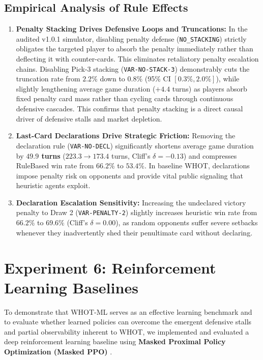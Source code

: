 \documentclass[11pt]{article}
\begin{document}
\subsection{Empirical Analysis of Rule Effects}
\begin{enumerate}
  \item \textbf{Penalty Stacking Drives Defensive Loops and Truncations:} In the audited v1.0.1 simulator, disabling penalty defense (\texttt{NO\_STACKING}) strictly obligates the targeted player to absorb the penalty immediately rather than deflecting it with counter-cards. This eliminates retaliatory penalty escalation chains. Disabling Pick-3 stacking (\texttt{VAR-NO-STACK-3}) demonstrably cuts the truncation rate from \textbf{$2.2\%$} down to \textbf{$0.8\%$} (95\% CI $[0.3\%, 2.0\%]$), while slightly lengthening average game duration ($+4.4$ turns) as players absorb fixed penalty card mass rather than cycling cards through continuous defensive cascades. This confirms that penalty stacking is a direct causal driver of defensive stalls and market depletion.
  \item \textbf{Last-Card Declarations Drive Strategic Friction:} Removing the declaration rule (\texttt{VAR-NO-DECL}) significantly shortens average game duration by \textbf{$49.9$ turns} ($223.3 \to 173.4$ turns, Cliff's $\delta = -0.13$) and compresses RuleBased win rate from $66.2\%$ to $53.4\%$. In baseline WHOT, declarations impose penalty risk on opponents and provide vital public signaling that heuristic agents exploit.
  \item \textbf{Declaration Escalation Sensitivity:} Increasing the undeclared victory penalty to Draw 2 (\texttt{VAR-PENALTY-2}) slightly increases heuristic win rate from $66.2\%$ to $69.6\%$ (Cliff's $\delta = 0.00$), as random opponents suffer severe setbacks whenever they inadvertently shed their penultimate card without declaring.
\end{enumerate}

\section{Experiment 6: Reinforcement Learning Baselines}
\label{sec:exp06_rl_baselines}

To demonstrate that WHOT-ML serves as an effective learning benchmark and to evaluate whether learned policies can overcome the emergent defensive stalls and partial observability inherent to WHOT, we implemented and evaluated a deep reinforcement learning baseline using \textbf{Masked Proximal Policy Optimization (Masked PPO)} \citep{schulman2017proximal}.
\end{document}
